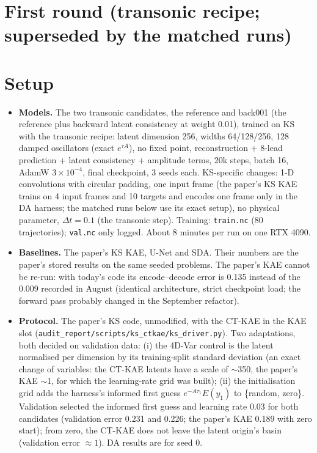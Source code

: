 \documentclass[10pt]{article}
\begin{document}
\section*{First round (transonic recipe; superseded by the matched runs)}
\section*{Setup}
\begin{itemize}\itemsep1pt
\item \textbf{Models.} The two transonic candidates, the reference and back001 (the reference plus
  backward latent consistency at weight 0.01), trained on KS with the transonic recipe: latent
  dimension 256, widths 64/128/256, 128 damped oscillators (exact $e^{\tau A}$), no fixed point,
  reconstruction + 8-lead prediction + latent consistency + amplitude terms, 20k steps, batch 16,
  AdamW $3\times10^{-4}$, final checkpoint, 3 seeds each. KS-specific changes: 1-D convolutions with
  circular padding, one input frame (the paper's KS KAE trains on 4 input frames and 10 targets and encodes
  one frame only in the DA harness; the matched runs below use its exact setup),
  no physical parameter, $\Delta t = 0.1$ (the transonic step). Training: \texttt{train.nc} (80
  trajectories); \texttt{val.nc} only logged. About 8 minutes per run on one RTX 4090.
\item \textbf{Baselines.} The paper's KS KAE, U-Net and SDA. Their numbers are the paper's stored
  results on the same seeded problems. The paper's KAE cannot be re-run: with today's code its
  encode--decode error is 0.135 instead of the 0.009 recorded in August (identical architecture,
  strict checkpoint load; the forward pass probably changed in the September refactor).
\item \textbf{Protocol.} The paper's KS code, unmodified, with the CT-KAE in the KAE slot
  (\texttt{audit\_report/\allowbreak scripts/\allowbreak ks\_ctkae/\allowbreak ks\_driver.py}). Two adaptations, both decided on
  validation data: (i) the 4D-Var control is the latent normalised per dimension by its
  training-split standard deviation (an exact change of variables: the CT-KAE latents have a
  scale of $\sim$350, the paper's KAE $\sim$1, for which the learning-rate grid was built);
  (ii) the initialisation grid adds the harness's informed first guess $e^{-A\tau_1}E(y_1)$ to
  \{random, zero\}. Validation selected the informed first guess and learning rate 0.03 for both
  candidates (validation error 0.231 and 0.226; the paper's KAE 0.189 with zero start); from zero,
  the CT-KAE does not leave the latent origin's basin (validation error $\approx1$). DA results are
  for seed 0.
\end{itemize}
\end{document}
